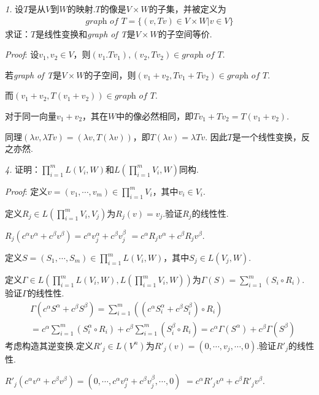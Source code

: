 \textit{1.}
设\(T\)是从\(V\)到\(W\)的映射.\(T\)的像是\(V \times W\)的子集，并被定义为
    \begin{align*}
        \textit{graph of T}= \{(v,Tv) \in V \times W |v \in V\}
    \end{align*}
求证：\(T\)是线性变换和\textit{graph of T}是\(V \times W\)的子空间等价.

\textit{Proof}:
设\(v_1,v_2 \in V\)，则\((v_1.Tv_1),(v_2,Tv_2) \in \textit{graph of T}\).

若\textit{graph of T}是\(V \times W\)的子空间，则\((v_1+v_2,Tv_1+Tv_2) \in \textit{graph of T}\).

而\((v_1+v_2,T(v_1+v_2)) \in \textit{graph of T}\).

对于同一向量\(v_1+v_2\)，其在\(W\)中的像必然相同，即\(Tv_1+Tv_2=T(v_1+v_2)\).

同理\((\lambda v,\lambda Tv)=(\lambda v,T(\lambda v))\)，即\(T(\lambda v)=\lambda Tv\).
因此\(T\)是一个线性变换，反之亦然.

\hspace*{\fill}

\textit{4.}
证明：\(\prod_{i=1}^m L(V_i,W)\)和\(L(\prod_{i=1}^m V_i,W)\)同构.

\textit{Proof}:
定义\(v=(v_1,\cdots,v_m) \in \prod_{i=1}^m V_i\)，其中\(v_i \in V_i\).

定义\(R_j \in L(\prod_{i=1}^m V_i,V_j)\)为\(R_j(v)=v_j\).验证\(R_j\)的线性性.

\(R_j(c^\alpha v^\alpha+c^\beta v^\beta)=c^\alpha v_j^\alpha+c^\beta v_j^\beta\)
\(=c^\alpha R_j v^\alpha+c^\beta R_j v^\beta\).

定义\(S=(S_1,\cdots,S_m) \in \prod_{i=1}^m L(V_i,W)\)，其中\(S_j \in L(V_j,W)\).

定义\(\Gamma \in L(\prod_{i=1}^m L(V_i,W),L(\prod_{i=1}^m V_i,W))\)为\(\Gamma(S)=\sum_{i=1}^m (S_i \circ R_i)\).
验证\(\Gamma\)的线性性.
    \begin{align*}
        &\Gamma(c^\alpha S^\alpha+c^\beta S^\beta)
        =\sum_{i=1}^m ((c^\alpha S_i^\alpha+c^\beta S_i^\beta) \circ R_i) \\
        &=c^\alpha \sum_{i=1}^m(S_i^\alpha \circ R_i)+c^\beta \sum_{i=1}^m(S_i^\beta \circ R_i)
        =c^\alpha \Gamma(S^\alpha)+c^\beta \Gamma(S^\beta)
    \end{align*}
考虑构造其逆变换.定义\(R'_j \in L(V^n)\)为\(R'_j(v)=(0,\cdots,v_j,\cdots,0)\).验证\(R'_j\)的线性性.

\(R'_j(c^\alpha v^\alpha+c^\beta v^\beta)=(0,\cdots,c^\alpha v_j^\alpha+c^\beta v_j^\beta,\cdots,0)\)
\(=c^\alpha R'_j v^\alpha+c^\beta R'_j v^\beta\).


